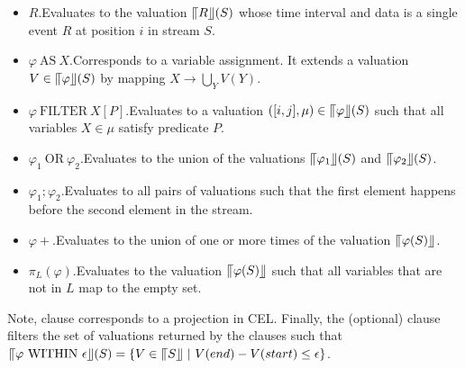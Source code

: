 \begin{itemize}
  \item $R$.\quad  Evaluates to the valuation $\llceil R \rrfloor(S)$ whose time interval and data is a single event $R$ at position $i$ in stream $S$.
  \item $\varphi \ \text{AS} \ X$.\quad Corresponds to a variable assignment. It extends a valuation $V \in \llceil \varphi \rrfloor(S)$ by mapping $X \to \bigcup_{Y}V(Y)$.
  \item $\varphi \ \text{FILTER} \ X[P]$.\quad Evaluates to a valuation $([i, j], \mu) \in \llceil \varphi \rrfloor(S)$ such that all variables $X \in \mu$ satisfy predicate $P$.
  \item $\varphi_{1} \ \text{OR} \ \varphi_{2}$.\quad Evaluates to the union of the valuations $\llceil \varphi_{1} \rrfloor(S)$ and $\llceil \varphi_{2} \rrfloor(S)$.
  \item $\varphi_{1} ; \varphi_{2}$.\quad Evaluates to all pairs of valuations such that the first element happens before the second element in the stream.
  \item $\varphi+$.\quad Evaluates to the union of one or more times of the valuation $\llceil \varphi(S) \rrfloor$.
  \item $\pi_{L}(\varphi)$.\quad Evaluates to the valuation $\llceil \varphi(S) \rrfloor$ such that all variables that are not in $L$ map to the empty set.
\end{itemize}

Note,  clause corresponds to a projection in CEL. Finally, the (optional) clause  filters the set of valuations returned by the  clauses such that $\InSBrackets{\varphi \ \text{WITHIN} \ \epsilon}(S) = \{ V \in \InSBrackets{S} \ | \ V(end) - V(start) \le \epsilon \}$.

